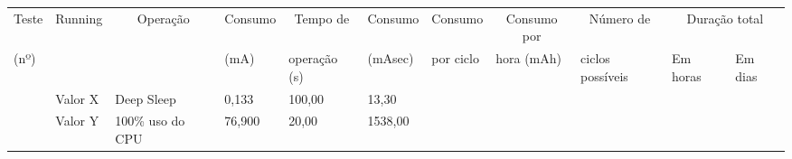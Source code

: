 \begin{table}[htp]
\begin{tabular}{lllllllllll}
\multicolumn{1}{|c|}{Teste}                                       & \multicolumn{1}{c|}{Running}                         & \multicolumn{1}{c|}{Operação}                                 & \multicolumn{1}{c|}{Consumo}                        & \multicolumn{1}{c|}{Tempo de}                       & \multicolumn{1}{c|}{Consumo}                         & \multicolumn{1}{c|}{Consumo}                                           & \multicolumn{1}{c|}{Consumo por}                                     & \multicolumn{1}{c|}{Número de}                                         & \multicolumn{2}{c|}{Duração total}                                                                                                        \\ \cline{10-11} 
\multicolumn{1}{|l|}{(nº)}                                        & \multicolumn{1}{l|}{}                                & \multicolumn{1}{l|}{}                                         & \multicolumn{1}{l|}{(mA)}                           & \multicolumn{1}{l|}{operação (s)}                   & \multicolumn{1}{l|}{(mAsec)}                         & \multicolumn{1}{l|}{por ciclo}                                         & \multicolumn{1}{l|}{hora (mAh)}                                      & \multicolumn{1}{l|}{ciclos possíveis}                                  & \multicolumn{1}{l|}{Em horas}                                       & \multicolumn{1}{l|}{Em dias}                                        \\ \hline
\rowcolor[HTML]{C0C0C0} 
\multicolumn{1}{|c|}{\cellcolor[HTML]{C0C0C0}}                    & \multicolumn{1}{l|}{\cellcolor[HTML]{C0C0C0}Valor X} & \multicolumn{1}{l|}{\cellcolor[HTML]{C0C0C0}Deep Sleep}       & \multicolumn{1}{l|}{\cellcolor[HTML]{C0C0C0}0,133}  & \multicolumn{1}{l|}{\cellcolor[HTML]{C0C0C0}100,00} & \multicolumn{1}{l|}{\cellcolor[HTML]{C0C0C0}13,30}   & \multicolumn{1}{l|}{\cellcolor[HTML]{C0C0C0}}                          & \multicolumn{1}{l|}{\cellcolor[HTML]{C0C0C0}}                        & \multicolumn{1}{l|}{\cellcolor[HTML]{C0C0C0}}                          & \multicolumn{1}{l|}{\cellcolor[HTML]{C0C0C0}}                       & \multicolumn{1}{l|}{\cellcolor[HTML]{C0C0C0}}                       \\ \cline{2-6}
\rowcolor[HTML]{C0C0C0} 
\multicolumn{1}{|c|}{\cellcolor[HTML]{C0C0C0}}                    & \multicolumn{1}{l|}{\cellcolor[HTML]{C0C0C0}Valor Y} & \multicolumn{1}{l|}{\cellcolor[HTML]{C0C0C0}100\% uso do CPU} & \multicolumn{1}{l|}{\cellcolor[HTML]{C0C0C0}76,900} & \multicolumn{1}{l|}{\cellcolor[HTML]{C0C0C0}20,00}  & \multicolumn{1}{l|}{\cellcolor[HTML]{C0C0C0}1538,00} & \multicolumn{1}{l|}{\cellcolor[HTML]{C0C0C0}}                          & \multicolumn{1}{l|}{\cellcolor[HTML]{C0C0C0}}                        & \multicolumn{1}{l|}{\cellcolor[HTML]{C0C0C0}}                          & \multicolumn{1}{l|}{\cellcolor[HTML]{C0C0C0}}                       & \multicolumn{1}{l|}{\cellcolor[HTML]{C0C0C0}}                       \\ \cline{2-6}

\end{tabular}
\end{table}
